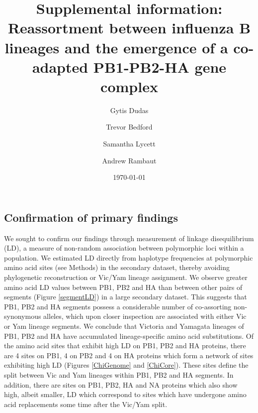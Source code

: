 \documentclass[11pt,oneside,letterpaper]{article}
\begin{document}
\title{\vspace{1.0cm} \huge \bf Supplemental information:\\ \LARGE Reassortment between influenza B lineages and the emergence of a co-adapted PB1-PB2-HA gene complex}

\author[1]{Gytis Dudas}
\author[2]{Trevor Bedford}
\author[1,3]{Samantha Lycett}
\author[1,4,5]{Andrew Rambaut}


\date{\today}

\maketitle

\setcounter{figure}{0}
\setcounter{table}{0}
\renewcommand{\thefigure}{S\arabic{figure}}
\renewcommand{\thetable}{S\arabic{table}}

\subsection*{Confirmation of primary findings}
We sought to confirm our findings through measurement of linkage disequilibrium (LD), a measure of non-random association between polymorphic loci within a population.
We estimated LD directly from haplotype frequencies at polymorphic amino acid sites (see Methods) in the secondary dataset, thereby avoiding phylogenetic reconstruction or Vic/Yam lineage assignment.
We observe greater amino acid LD values between PB1, PB2 and HA than between other pairs of segments (Figure \ref{segmentLD}) in a large secondary dataset.
This suggests that PB1, PB2 and HA segments possess a considerable number of co-assorting non-synonymous alleles, which upon closer inspection are associated with either Vic or Yam lineage segments.
We conclude that Victoria and Yamagata lineages of PB1, PB2 and HA have accumulated lineage-specific amino acid substitutions.
Of the amino acid sites that exhibit high LD on PB1, PB2 and HA proteins, there are 4 sites on PB1, 4 on PB2 and 4 on HA proteins which form a network of sites exhibiting high LD (Figures \ref{ChiGenome} and \ref{ChiCore}).
These sites define the split between Vic and Yam lineages within PB1, PB2 and HA segments.
In addition, there are sites on PB1, PB2, HA and NA proteins which also show high, albeit smaller, LD which correspond to sites which have undergone amino acid replacements some time after the Vic/Yam split.
\end{document}
